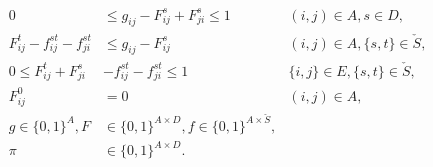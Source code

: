 \begin{subequations}
\begin{flalign}
\label{con:mfinpf2:xbound} 0&\leq g_{ij}-F_{ij}^s+F_{ji}^s  \leq 1 & (i,j)\in A, s\in D,\\
\label{con:mfinpf2:fcap} F^t_{ij} -  f^{st}_{ij} -  f^{st}_{ji} &\leq  g_{ij}-F^s_{ij} & (i,j)\in A, \{s,t\}\in \check{S},\\
\label{con:mfinpf2:fbound} 0  \leq F^t_{ij}+F_{ji}^s & - f_{ij}^{st}- f_{ji}^{st}  \leq 1 & \{i,j\}\in E,\{s,t\}\in \check{S},\\
\label{con:mfinpf2:fij00} F^0_{ij} &=0 & (i,j)\in A,\\
\label{con:mfinpf2:dim} g \in \{0,1\}^{A},F&\in\{0,1\}^{A \times D}, f\in\{0,1\}^{A\times \check{S}},\\
\label{con:mfinpf2:dimy} \pi &\in \{0,1\}^{A\times D}.
\end{flalign}
\end{subequations}

